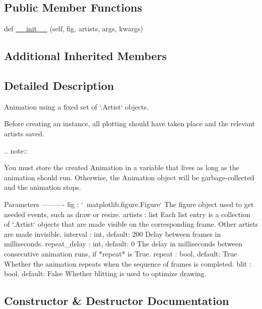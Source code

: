 \subsection*{Public Member Functions}
\begin{DoxyCompactItemize}
\item 
def \hyperlink{classmatplotlib_1_1animation_1_1ArtistAnimation_a4e5c4a33b17b5fdea648c2cda0ffbedf}{\+\_\+\+\_\+init\+\_\+\+\_\+} (self, fig, artists, args, kwargs)
\end{DoxyCompactItemize}
\subsection*{Additional Inherited Members}


\subsection{Detailed Description}
\begin{DoxyVerb}Animation using a fixed set of `.Artist` objects.

Before creating an instance, all plotting should have taken place
and the relevant artists saved.

.. note::

    You must store the created Animation in a variable that lives as long
    as the animation should run. Otherwise, the Animation object will be
    garbage-collected and the animation stops.

Parameters
----------
fig : `~matplotlib.figure.Figure`
    The figure object used to get needed events, such as draw or resize.
artists : list
    Each list entry is a collection of `.Artist` objects that are made
    visible on the corresponding frame.  Other artists are made invisible.
interval : int, default: 200
    Delay between frames in milliseconds.
repeat_delay : int, default: 0
    The delay in milliseconds between consecutive animation runs, if
    *repeat* is True.
repeat : bool, default: True
    Whether the animation repeats when the sequence of frames is completed.
blit : bool, default: False
    Whether blitting is used to optimize drawing.
\end{DoxyVerb}
 

\subsection{Constructor \& Destructor Documentation}
\mbox{\label{classmatplotlib_1_1animation_1_1ArtistAnimation_a4e5c4a33b17b5fdea648c2cda0ffbedf}} 
